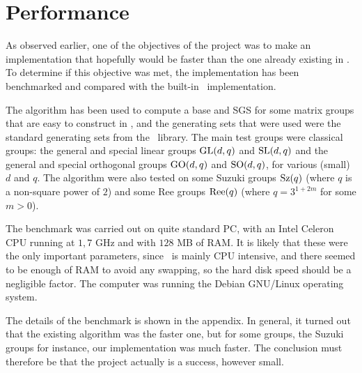 \chapter{Performance}

As observed earlier, one of the objectives of the project was to make
an implementation that hopefully would be faster than the one already
existing in \GAP. To determine if this objective was met, the
implementation has been benchmarked and compared with the built-in
\GAP~implementation.

The algorithm has been used to compute a base and SGS for some matrix
groups that are easy to construct in \GAP, and the generating sets
that were used were the standard generating sets from the
\GAP~library. The main test groups were classical groups: the general
and special linear groups $\operatorname{GL}(d, q)$ and $\operatorname{SL}(d, q)$ and the general
and special orthogonal groups $\operatorname{GO}(d, q)$ and $\operatorname{SO}(d, q)$, for various
(small) $d$ and $q$. The algorithm were also tested on some Suzuki
groups $\operatorname{Sz}(q)$ (where $q$ is a non-square power of $2$) and some Ree
groups $\operatorname{Ree}(q)$ (where $q = 3^{1 + 2m}$ for some $m > 0$).

The benchmark was carried out on quite standard PC, with an Intel Celeron
CPU running at $1,7$ GHz and with $128$ MB of RAM. It is likely
that these were the only important parameters, since \GAP~is mainly
CPU intensive, and there seemed to be enough of RAM to avoid any
swapping, so the hard disk speed should be a negligible factor. The computer
was running the Debian GNU/Linux operating system. 

The details of the benchmark is shown in the appendix. In general, it
turned out that the existing algorithm was the faster one, but
for some groups, the Suzuki groups for instance, our implementation
was much faster. The conclusion must therefore be that the project actually
is a success, however small.
